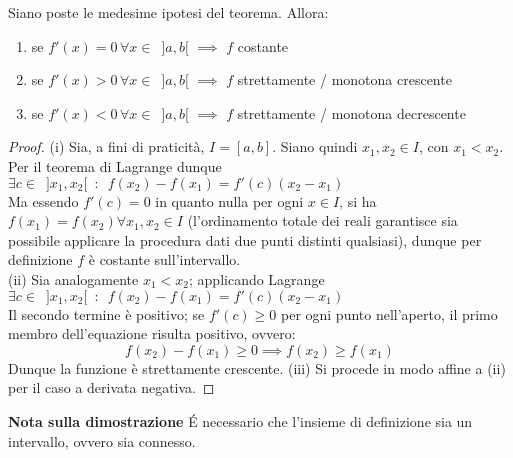 \documentclass[10pt, oneside]{book}
\theoremstyle{plain}
\begin{document}
\begin{cor}
\label{corlagrange}
Siano poste le medesime ipotesi del teorema. Allora:
\begin{enumerate}[label=$\square$]
    \item se $f'(x) = 0 \, \forall x \in \enspace ]a, b[$ $\implies$ $f$ costante
    \item se $f'(x) > 0 \, \forall x \in \enspace ]a, b[$ $\implies$ $f$ strettamente / monotona crescente
    \item se $f'(x) < 0 \, \forall x \in \enspace ]a, b[$ $\implies$ $f$ strettamente / monotona decrescente
\end{enumerate}
\end{cor}
\begin{proof}
(i) Sia, a fini di praticità, $I = [a, b]$. Siano quindi $x_1, x_2 \in I$, con $x_1 < x_2$. Per il teorema di Lagrange dunque $\exists c \in \enspace ]x_1, x_2[ \enspace : \enspace f(x_2) - f(x_1) = f'(c)(x_2 - x_1)$\\
Ma essendo $f'(c) = 0$ in quanto nulla per ogni $x \in I$, si ha $f(x_1) = f(x_2) \forall x_1, x_2 \in I$ (l'ordinamento totale dei reali garantisce sia possibile applicare la procedura dati due punti distinti qualsiasi), dunque per definizione $f$ è costante sull'intervallo.\\
(ii) Sia analogamente $x_1 < x_2$; applicando Lagrange $\exists c \in \enspace ]x_1, x_2[ \enspace : \enspace f(x_2) - f(x_1) = f'(c)(x_2 - x_1)$\\
Il secondo termine è positivo; se $f'(c) \geq 0$ per ogni punto nell'aperto, il primo membro dell'equazione risulta positivo, ovvero:
\[f(x_2) - f(x_1) \geq 0 \implies f(x_2) \geq f(x_1)\]
Dunque la funzione è strettamente crescente.
(iii) Si procede in modo affine a (ii) per il caso a derivata negativa.
\end{proof}
\textbf{Nota sulla dimostrazione} \'E necessario che l'insieme di definizione sia un intervallo, ovvero sia connesso.
\end{document}
